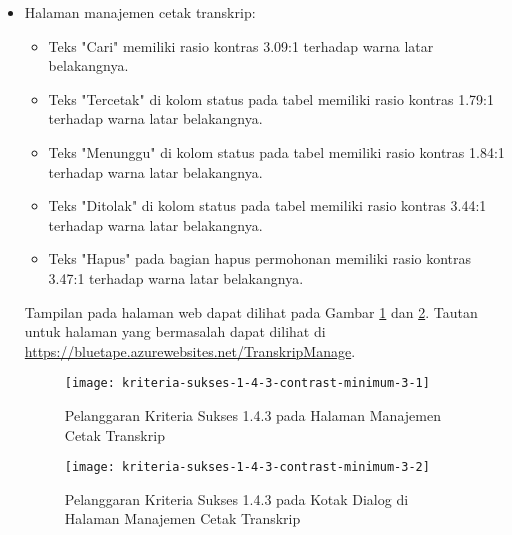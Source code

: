 \begin{itemize}
    \item Halaman manajemen cetak transkrip: 
    \begin{itemize}
        \item Teks "Cari" memiliki rasio kontras 3.09:1 terhadap warna latar belakangnya.
        \item Teks "Tercetak" di kolom status pada tabel memiliki rasio kontras 1.79:1 terhadap warna latar belakangnya.
        \item Teks "Menunggu" di kolom status pada tabel memiliki rasio kontras 1.84:1 terhadap warna latar belakangnya.
        \item Teks "Ditolak" di kolom status pada tabel memiliki rasio kontras 3.44:1 terhadap warna latar belakangnya.
        \item Teks "Hapus" pada bagian hapus permohonan memiliki rasio kontras 3.47:1 terhadap warna latar belakangnya.
    \end{itemize}
    Tampilan pada halaman web dapat dilihat pada Gambar \ref{fig:1.4.3_contrast_minimum_3_1} dan \ref{fig:1.4.3_contrast_minimum_3_2}. Tautan untuk halaman yang bermasalah dapat dilihat di \url{https://bluetape.azurewebsites.net/TranskripManage}.
    \begin{figure}[H]
        \centering  
        \texttt{[image: kriteria-sukses-1-4-3-contrast-minimum-3-1]}  
        \caption[Pelanggaran Kriteria Sukses 1.4.3 pada Halaman Manajemen Cetak Transkrip]{Pelanggaran Kriteria Sukses 1.4.3 pada Halaman Manajemen Cetak Transkrip}
        \label{fig:1.4.3_contrast_minimum_3_1}
    \end{figure} 
    
    \begin{figure}[H]
        \centering  
        \texttt{[image: kriteria-sukses-1-4-3-contrast-minimum-3-2]}  
        \caption[Pelanggaran Kriteria Sukses 1.4.3 pada Kotak Dialog di Halaman Manajemen Cetak Transkrip]{Pelanggaran Kriteria Sukses 1.4.3 pada Kotak Dialog di Halaman Manajemen Cetak Transkrip}
        \label{fig:1.4.3_contrast_minimum_3_2}
    \end{figure} 


\end{itemize}
